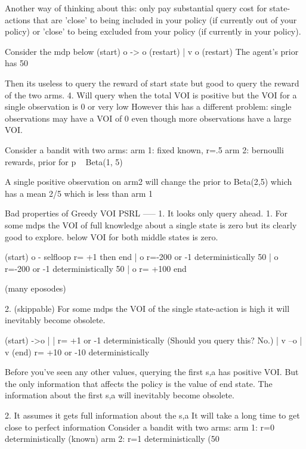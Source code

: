 {  Another way of thinking about this:
    only pay substantial query cost for state-actions that are 'close' to being included in your policy (if currently out of your policy) or 'close' to being excluded from your policy (if currently in your policy).

    Consider the mdp below
  (start)
    o -> o (restart)
    |
    v
    o
    (restart)
    The agent's prior has 50%

    Then its useless to query the reward of start state but good to query the reward of the two arms.
4. Will query when the total VOI is positive but the VOI for a single observation is 0 or very low
      However this has a different problem: single observations may have a VOI of 0 even though more observations have a large VOI.

      Consider a bandit with two arms:
        arm 1: fixed known, r=.5 
        arm 2: bernoulli rewards, prior for p ~ Beta(1, 5)

      A single positive observation on arm2 will change the prior to Beta(2,5) which has a mean 2/5 which is less than arm 1

Bad properties of Greedy VOI PSRL
-----
1. It looks only query ahead. 
  1. For some mdps the VOI of full knowledge about a single state is zero but its clearly good to explore.
  below VOI for both middle states is zero.  

  (start)
    o - selfloop r= +1 then end 
    |
    o r=-200 or -1 deterministically 50%
    |
    o r=-200 or -1 deterministically 50%
    | 
    o r= +100 end

    (many eposodes)

  2. (skippable) For some mdps the VOI of the single state-action is high it will inevitably become obsolete.

  (start)
  ->o
  | | r= +1 or -1 deterministically (Should you query this? No.)
  | v
  --o
    |
    v
   (end) r= +10 or -10 deterministically 

   Before you've seen any other values, querying the first s,a has positive VOI. But the only information that affects the policy is the value of end state. The information about the first s,a will inevitably become obsolete.
    
2. It assumes it gets full information about the s,a
    It will take a long time to get close to perfect information
      Consider a bandit with two arms: 
        arm 1: r=0 deterministically (known) 
        arm 2: r=1 deterministically (50%
        
}

